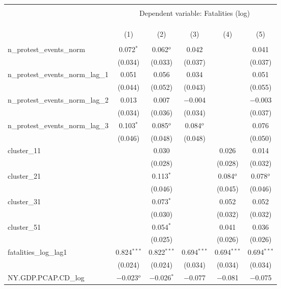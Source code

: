 
\begin{tabular}{@{\extracolsep{5pt}}lccccc} 
\\[-1.8ex]\hline 
\hline \\[-1.8ex] 
 & \multicolumn{5}{c}{Dependent variable: Fatalities (log)} \\ 
\cline{2-6} 
\\[-1.8ex] & \multicolumn{5}{c}{ } \\ 
\\[-1.8ex] & (1) & (2) & (3) & (4) & (5)\\ 
\hline \\[-1.8ex] 
 n\_protest\_events\_norm & 0.072$^{*}$ & 0.062$^{o}$ & 0.042 &  & 0.041 \\ 
  & (0.034) & (0.033) & (0.037) &  & (0.037) \\ 
  n\_protest\_events\_norm\_lag\_1 & 0.051 & 0.056 & 0.034 &  & 0.051 \\ 
  & (0.044) & (0.052) & (0.043) &  & (0.055) \\ 
  n\_protest\_events\_norm\_lag\_2 & 0.013 & 0.007 & $-$0.004 &  & $-$0.003 \\ 
  & (0.034) & (0.036) & (0.034) &  & (0.037) \\ 
  n\_protest\_events\_norm\_lag\_3 & 0.103$^{*}$ & 0.085$^{o}$ & 0.084$^{o}$ &  & 0.076 \\ 
  & (0.046) & (0.048) & (0.048) &  & (0.050) \\ 
  cluster\_11 &  & 0.030 &  & 0.026 & 0.014 \\ 
  &  & (0.028) &  & (0.028) & (0.032) \\ 
  cluster\_21 &  & 0.113$^{*}$ &  & 0.084$^{o}$ & 0.078$^{o}$ \\ 
  &  & (0.046) &  & (0.045) & (0.046) \\ 
  cluster\_31 &  & 0.073$^{*}$ &  & 0.052 & 0.052 \\ 
  &  & (0.030) &  & (0.032) & (0.032) \\ 
  cluster\_51 &  & 0.054$^{*}$ &  & 0.041 & 0.036 \\ 
  &  & (0.025) &  & (0.026) & (0.026) \\ 
  fatalities\_log\_lag1 & 0.824$^{***}$ & 0.822$^{***}$ & 0.694$^{***}$ & 0.694$^{***}$ & 0.694$^{***}$ \\ 
  & (0.024) & (0.024) & (0.034) & (0.034) & (0.034) \\ 
  NY.GDP.PCAP.CD\_log & $-$0.023$^{o}$ & $-$0.026$^{*}$ & $-$0.077 & $-$0.081 & $-$0.075 \\ 

\end{tabular}
